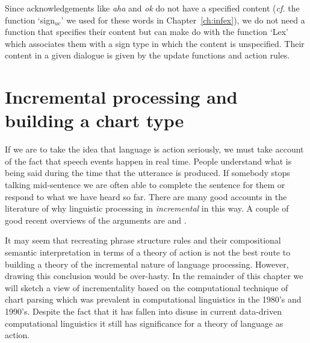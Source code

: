 
Since acknowledgements like \textit{aha} and
\textit{ok} do not have a specified content (\textit{cf.} the function
`sign$_{\mathit{uc}}$' we used for these words in
Chapter~\ref{ch:infex}), we do not need a function that specifies
their content but can make do with the function `Lex' which associates
them with a sign type in which the content is unspecified.  Their
content in a given dialogue is given by the update functions and
action rules.

\section{Incremental processing and building a chart type}


If we are to take the idea that language is action seriously, we must
take account of the fact that speech events happen in real time.
People understand what is being said during the time that the
utterance is produced.  If somebody stops talking mid-sentence we are
often able to complete the sentence for them or respond to what we
have heard so far.  There are many good accounts in the literature of
why linguistic processing in \textit{incremental} in this way.  A
couple of good recent overviews of the arguments are
\cite{GinzburgPoesio2016} and
\cite{KempsonCannGregoromichelakiChatzikyriakidis2016}.

It may seem that recreating phrase structure rules and their
compositional semantic interpretation in terms of a theory of action
is not the best route to building a theory of the incremental nature
of language processing.  However, drawing this conclusion would be
over-hasty.  In the remainder of this chapter we will sketch a view of
incrementality based on the computational technique of chart parsing
which was prevalent in computational linguistics in the 1980's and
1990's.  Despite the fact that it has fallen into disuse in current
data-driven computational linguistics it still has significance for a
theory of language as action.

